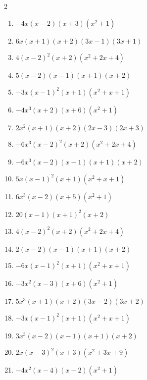 \documentclass[11pt,oneside]{book}
\begin{document}
\begin{multicols}{2}
\begin{enumerate}[leftmargin=*,label=\textbf{I\arabic*.},itemsep=0.45\baselineskip]
\item $ - 4 x \left(x - 2\right) \left(x + 3\right) \left(x^{2} + 1\right) $
\item $ 6 x \left(x + 1\right) \left(x + 2\right) \left(3 x - 1\right) \left(3 x + 1\right) $
\item $ 4 \left(x - 2\right)^{2} \left(x + 2\right) \left(x^{2} + 2 x + 4\right) $
\item $ 5 \left(x - 2\right) \left(x - 1\right) \left(x + 1\right) \left(x + 2\right) $
\item $ - 3 x \left(x - 1\right)^{2} \left(x + 1\right) \left(x^{2} + x + 1\right) $
\item $ - 4 x^{3} \left(x + 2\right) \left(x + 6\right) \left(x^{2} + 1\right) $
\item $ 2 x^{2} \left(x + 1\right) \left(x + 2\right) \left(2 x - 3\right) \left(2 x + 3\right) $
\item $ - 6 x^{3} \left(x - 2\right)^{2} \left(x + 2\right) \left(x^{2} + 2 x + 4\right) $
\item $ - 6 x^{3} \left(x - 2\right) \left(x - 1\right) \left(x + 1\right) \left(x + 2\right) $
\item $ 5 x \left(x - 1\right)^{2} \left(x + 1\right) \left(x^{2} + x + 1\right) $
\item $ 6 x^{3} \left(x - 2\right) \left(x + 5\right) \left(x^{2} + 1\right) $
\item $ 20 \left(x - 1\right) \left(x + 1\right)^{2} \left(x + 2\right) $
\item $ 4 \left(x - 2\right)^{2} \left(x + 2\right) \left(x^{2} + 2 x + 4\right) $
\item $ 2 \left(x - 2\right) \left(x - 1\right) \left(x + 1\right) \left(x + 2\right) $
\item $ - 6 x \left(x - 1\right)^{2} \left(x + 1\right) \left(x^{2} + x + 1\right) $
\item $ - 3 x^{2} \left(x - 3\right) \left(x + 6\right) \left(x^{2} + 1\right) $
\item $ 5 x^{3} \left(x + 1\right) \left(x + 2\right) \left(3 x - 2\right) \left(3 x + 2\right) $
\item $ - 3 x \left(x - 1\right)^{2} \left(x + 1\right) \left(x^{2} + x + 1\right) $
\item $ 3 x^{3} \left(x - 2\right) \left(x - 1\right) \left(x + 1\right) \left(x + 2\right) $
\item $ 2 x \left(x - 3\right)^{2} \left(x + 3\right) \left(x^{2} + 3 x + 9\right) $
\item $ - 4 x^{2} \left(x - 4\right) \left(x - 2\right) \left(x^{2} + 1\right) $

\end{enumerate}
\end{multicols}
\end{document}
